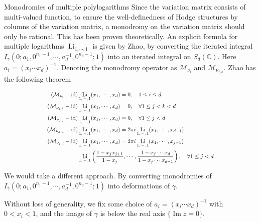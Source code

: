 \documentclass[8pt]{beamer}
\DeclareMathOperator{\Li}{Li}
\DeclareMathOperator{\id}{id}
\theoremstyle{definition}
\theoremstyle{remark}
\begin{document}
\begin{frame}[t]{Monodromies of multiple polylogarithms}
Since the variation matrix consists of multi-valued function, to ensure the well-definedness of Hodge structures by columns of the variation matrix, a monodromy on the variation matrix should only be rational. This has been proven theoretically. An explicit formula for multiple logarithms $\Li_{1,\cdots,1}$ is given by Zhao, by converting the iterated integral $I_\gamma(0;a_1,0^{n_1-1},\cdots,a_d^{-1},0^{n_d-1};1)$ into an iterated integral on $S_d(\mathbb C)$. Here $a_i=(x_i\cdots x_d)^{-1}$. Denoting the monodromy operator as $\mathcal M_{\nu_i}$ and $\mathcal M_{\nu_{j,k}}$. Zhao has the following theorem

\begin{theorem}
\begin{equation}
\scalebox{.8}{$
\begin{aligned}
(\mathcal M_{\nu_i}-\id)&\Li_{1,\cdots,1}(x_1,\cdots,x_d)=0,\quad 1\leq i\leq d \\
(\mathcal M_{\nu_{j,k}}-\id)&\Li_{1,\cdots,1}(x_1,\cdots,x_d)=0,\quad\forall 1\leq j<k<d \\
(\mathcal M_{\nu_{j,j}}-\id)&\Li_{1,\cdots,1}(x_1,\cdots,x_d)=0,\quad\forall 1\leq j<d \\
(\mathcal M_{\nu_{d,d}}-\id)&\Li_{1,\cdots,1}(x_1,\cdots,x_d)=2\pi i\Li_{1,\cdots,1}(x_1,\cdots,x_{d-1}) \\
(\mathcal M_{\nu_{j,d}}-\id)&\Li_{1,\cdots,1}(x_1,\cdots,x_d)=2\pi i\Li_{1,\cdots,1}(x_1,\cdots,x_{j-1})\\
&\Li_{1,\cdots,1}\left(\frac{1-x_jx_{j+1}}{1-x_j},\cdots,\frac{1-x_j\cdots x_d}{1-x_j\cdots x_{d-1}}\right),\quad \forall 1\leq j<d
\end{aligned}
$}
\end{equation}
\end{theorem}

We would take a different approach. By converting monodromies of $I_\gamma(0;a_1,0^{n_1-1},\cdots,a_d^{-1},0^{n_d-1};1)$ into deformations of $\gamma$.
\vspace{10pt}

Without loss of generality, we fix some choice of $a_i=(x_i\cdots x_d)^{-1}$ with $0<x_i<1$, and the image of $\gamma$ is below the real axis $\{\operatorname{Im} z=0\}$.
\end{frame}
\end{document}
